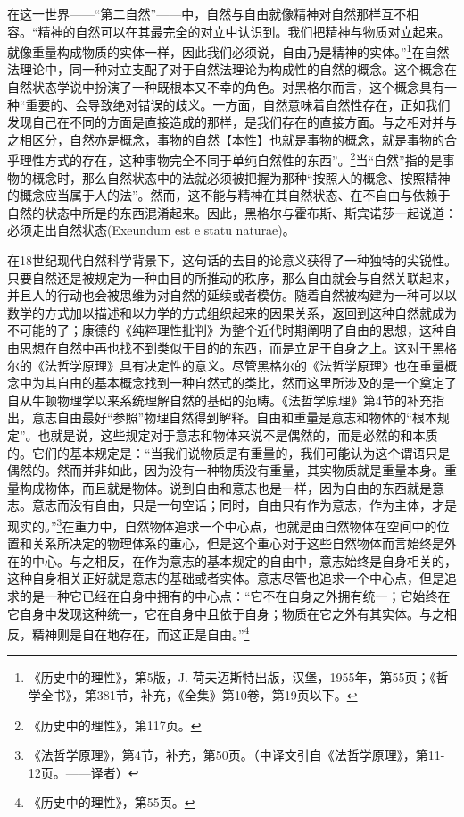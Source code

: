 在这一世界——“第二自然”——中，自然与自由就像精神对自然那样互不相容。“精神的自然可以在其最完全的对立中认识到。我们把精神与物质对立起来。就像重量构成物质的实体一样，因此我们必须说，自由乃是精神的实体。”\footnote{《历史中的理性》，第5版，J. 荷夫迈斯特出版，汉堡，1955年，第55页；《哲学全书》，第381节，补充，《全集》第10卷，第19页以下。}在自然法理论中，同一种对立支配了对于自然法理论为构成性的自然的概念。这个概念在自然状态学说中扮演了一种既根本又不幸的角色。对黑格尔而言，这个概念具有一种“重要的、会导致绝对错误的歧义。一方面，自然意味着自然性存在，正如我们发现自己在不同的方面是直接造成的那样，是我们存在的直接方面。与之相对并与之相区分，自然亦是概念，事物的自然【本性】也就是事物的概念，就是事物的合乎理性方式的存在，这种事物完全不同于单纯自然性的东西”。\footnote{《历史中的理性》，第117页。}当“自然”指的是事物的概念时，那么自然状态中的法就必须被把握为那种“按照人的概念、按照精神的概念应当属于人的法”。然而，这不能与精神在其自然状态、在不自由与依赖于自然的状态中所是的东西混淆起来。因此，黑格尔与霍布斯、斯宾诺莎一起说道：必须走出自然状态(Exeundum est e statu naturae)。

在18世纪现代自然科学背景下，这句话的去目的论意义获得了一种独特的尖锐性。只要自然还是被规定为一种由目的所推动的秩序，那么自由就会与自然关联起来，并且人的行动也会被思维为对自然的延续或者模仿。随着自然被构建为一种可以以数学的方式加以描述和以力学的方式组织起来的因果关系，返回到这种自然就成为不可能的了；康德的《纯粹理性批判》为整个近代时期阐明了自由的思想，这种自由思想在自然中再也找不到类似于目的的东西，而是立足于自身之上。这对于黑格尔的《法哲学原理》具有决定性的意义。尽管黑格尔的《法哲学原理》也在重量概念中为其自由的基本概念找到一种自然式的类比，然而这里所涉及的是一个奠定了自从牛顿物理学以来系统理解自然的基础的范畴。《法哲学原理》第4节的补充指出，意志自由最好“参照”物理自然得到解释。自由和重量是意志和物体的“根本规定”。也就是说，这些规定对于意志和物体来说不是偶然的，而是必然的和本质的。它们的基本规定是：“当我们说物质是有重量的，我们可能认为这个谓语只是偶然的。然而并非如此，因为没有一种物质没有重量，其实物质就是重量本身。重量构成物体，而且就是物体。说到自由和意志也是一样，因为自由的东西就是意志。意志而没有自由，只是一句空话；同时，自由只有作为意志，作为主体，才是现实的。”\footnote{《法哲学原理》，第4节，补充，第50页。（中译文引自《法哲学原理》，第11-12页。——译者）}在重力中，自然物体追求一个中心点，也就是由自然物体在空间中的位置和关系所决定的物理体系的重心，但是这个重心对于这些自然物体而言始终是外在的中心。与之相反，在作为意志的基本规定的自由中，意志始终是自身相关的，这种自身相关正好就是意志的基础或者实体。意志尽管也追求一个中心点，但是追求的是一种它已经在自身中拥有的中心点：“它不在自身之外拥有统一；它始终在它自身中发现这种统一，它在自身中且依于自身；物质在它之外有其实体。与之相反，精神则是自在地存在，而这正是自由。”\footnote{《历史中的理性》，第55页。}


